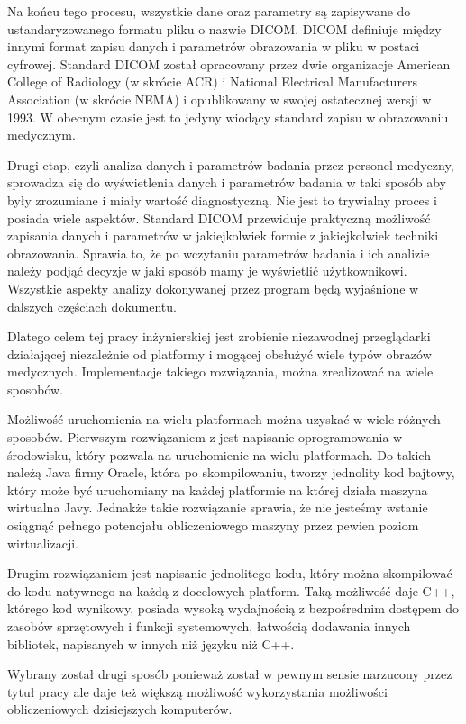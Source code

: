 Na końcu tego procesu, wszystkie dane oraz parametry są zapisywane do ustandaryzowanego formatu pliku o nazwie DICOM.
DICOM definiuje między innymi format zapisu danych i parametrów obrazowania w pliku w postaci cyfrowej.
Standard DICOM został opracowany przez dwie organizacje American College of Radiology (w skrócie ACR) i National Electrical Manufacturers Association (w skrócie NEMA) i opublikowany w swojej ostatecznej wersji w 1993.
W obecnym czasie jest to jedyny wiodący standard zapisu w obrazowaniu medycznym.

Drugi etap, czyli analiza danych i parametrów badania przez personel medyczny, sprowadza się do wyświetlenia danych i parametrów badania w taki sposób aby były zrozumiane i miały wartość diagnostyczną.
Nie jest to trywialny proces i posiada wiele aspektów.
Standard DICOM przewiduje praktyczną możliwość zapisania danych i parametrów w jakiejkolwiek formie z jakiejkolwiek techniki obrazowania.
Sprawia to, że po wczytaniu parametrów badania i ich analizie należy podjąć decyzje w jaki sposób mamy je wyświetlić użytkownikowi.
Wszystkie aspekty analizy dokonywanej przez program będą wyjaśnione w dalszych częściach dokumentu.

Dlatego celem tej pracy inżynierskiej jest zrobienie niezawodnej przeglądarki działającej niezależnie od platformy i mogącej obsłużyć wiele typów obrazów medycznych.
Implementacje takiego rozwiązania, można zrealizować na wiele sposobów.

Możliwość uruchomienia na wielu platformach można uzyskać w wiele różnych sposobów.
Pierwszym rozwiązaniem z jest napisanie oprogramowania w środowisku, który pozwala na uruchomienie na wielu platformach.
Do takich należą Java firmy Oracle, która po skompilowaniu, tworzy jednolity kod bajtowy, który może być uruchomiany na każdej platformie na której działa maszyna wirtualna Javy.
Jednakże takie rozwiązanie sprawia, że nie jesteśmy wstanie osiągnąć pełnego potencjału obliczeniowego maszyny przez pewien poziom wirtualizacji.

Drugim rozwiązaniem jest napisanie jednolitego kodu, który można skompilować do kodu natywnego na każdą z docelowych platform.
Taką możliwość daje C++, którego kod wynikowy, posiada wysoką wydajnością z bezpośrednim dostępem do zasobów sprzętowych i funkcji systemowych, łatwością dodawania innych bibliotek, napisanych w innych niż języku niż C++.

Wybrany został drugi sposób ponieważ został w pewnym sensie narzucony przez tytuł pracy ale daje też większą możliwość wykorzystania możliwości obliczeniowych dzisiejszych komputerów.

